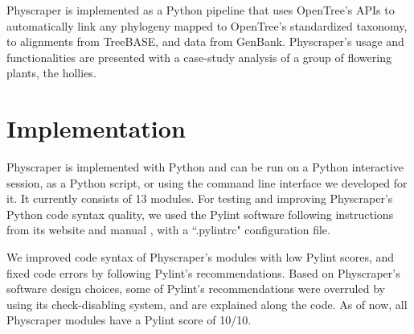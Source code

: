 \documentclass{bmcart}
\begin{document}
Physcraper is implemented as a Python pipeline that uses OpenTree's APIs to automatically
link any phylogeny mapped to OpenTree's standardized taxonomy,
to alignments from TreeBASE, and data from GenBank.
Physcraper's usage and functionalities are presented with a case-study analysis of a
group of flowering plants, the hollies.


\section*{Implementation}

Physcraper is implemented with Python and can be run on a Python interactive session,
as a Python script, or using the command line interface we developed for it.
It currently consists of 13 modules.
For testing and improving Physcraper's Python code syntax quality, we
used the Pylint software following instructions from its website \cite{pylintWeb}
 and manual \cite{pylintManual}, with a ``.pylintrc" configuration file.

We improved code syntax of Physcraper's modules with low Pylint scores, and fixed code errors by
following Pylint's recommendations.
Based on Physcraper's software design choices, some of Pylint's recommendations were overruled
by using its check-disabling system, and are explained along the code.
As of now, all Physcraper modules have a Pylint score of 10/10.

\end{document}
